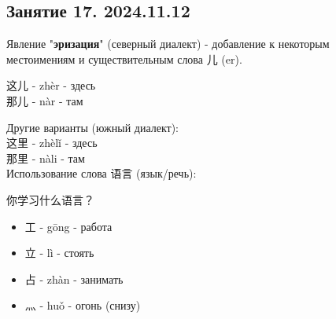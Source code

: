\LARGE
\newpage
\subsection{Занятие 17. 2024.11.12}
Явление "\textbf{эризация}" (северный диалект) - добавление к некоторым\\
местоимениям и существительным слова 儿 (er).
\begin{example}\hfill\break
	这儿 - zhèr - здесь\\
	那儿 - nàr - там\\
\end{example}
Другие варианты (южный диалект):\\
这里 - zhèlǐ - здесь\\
那里 - nàli - там\\

Использование слова 语言 (язык/речь):
\begin{example}\hfill\break
	你学习什么语言？\\
\end{example}
\begin{newgraphems}\hfill
	\begin{itemize}
		\item 工 - gōng - работа
		\item 立 - lì - стоять
		\item 占 - zhàn - занимать
		\item 灬 - huǒ - огонь (снизу)
	\end{itemize}
\end{newgraphems}

